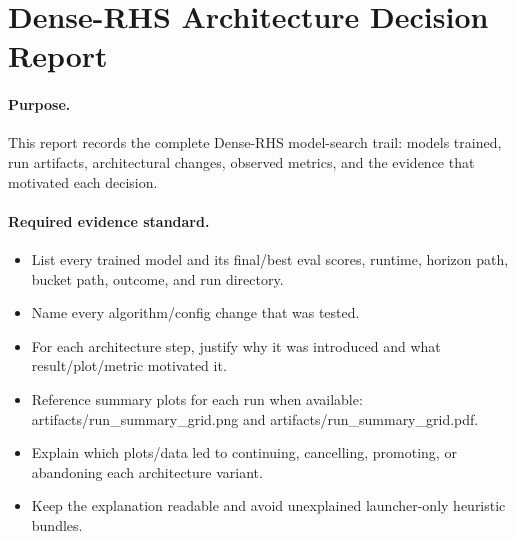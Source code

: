 \section{Dense-RHS Architecture Decision Report}

\paragraph{Purpose.}
This report records the complete Dense-RHS model-search trail: models trained, run artifacts, architectural changes, observed metrics, and the evidence that motivated each decision.

\paragraph{Required evidence standard.}
\begin{itemize}
\item List every trained model and its final/best eval scores, runtime, horizon path, bucket path, outcome, and run directory.
\item Name every algorithm/config change that was tested.
\item For each architecture step, justify why it was introduced and what result/plot/metric motivated it.
\item Reference summary plots for each run when available: artifacts/run\_summary\_grid.png and artifacts/run\_summary\_grid.pdf.
\item Explain which plots/data led to continuing, cancelling, promoting, or abandoning each architecture variant.
\item Keep the explanation readable and avoid unexplained launcher-only heuristic bundles.
\end{itemize}

